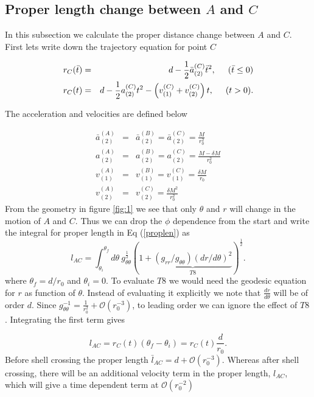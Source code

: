 \documentclass[aps,showpacs,onecolumn,floats,prd,superscriptaddress,nofootinbib]{revtex4-1}
\begin{document}
\subsection{Proper length change between $A$ and $C$}

In this subsection we calculate the proper distance change between $A$ and $C$. First lets write down the trajectory equation for point $C$

\begin{eqnarray}
	r_{C}(\bar{t})  & = & d - \frac{1}{2} \bar{a}_{(2)}^{(C)}  \bar{t}^2 ,  \hspace{5mm} (\bar{t} \leq 0 )		\nonumber	\\
	r_{C}(t) & = &  d - \frac{1}{2} a_{(2)}^{(C)} t^2 - \left(v^{(C)}_{(1)} + v^{(C)}_{(2)} \right) t,  \hspace{5mm} (t >0) . 
\end{eqnarray}

The acceleration and velocities are defined below

\begin{eqnarray}
	\bar{a}^{(A)}_{(2)} & = & \bar{a}^{(B)}_{(2)} = \bar{a}^{(C)}_{(2)} = \frac{M}{r_0^2}	\nonumber	\\
	a^{(A)}_{(2)} & = & a^{(B)}_{(2)} = a^{(C)}_{(2)} = \frac{M - \delta M}{r_0^2}	\nonumber	\\
	v^{(A)}_{(1)} & = & v^{(B)}_{(1)} = v^{(C)}_{(1)}  =  \frac{\delta M}{r_0} 	\nonumber	\\
	v^{(A)}_{(2)} & = & v^{(C)}_{(2)} =  \frac{\delta M^2}{r_0^2}		
\end{eqnarray}
From the geometry in figure \ref{fig:1} we see that only $\theta$ and $r$ will change in the motion of $A$ and $C$. Thus we can drop the $\phi$ dependence from the start and write the integral for proper length in Eq (\ref{proplen}) as
\begin{equation}
	 l_{AC} = \int^{\theta_f}_{\theta_i} d \theta \ g_{\theta \theta}^\frac{1}{2} \left(  1 + \underbrace{(g_{rr}/g_{\theta \theta}) (dr/d\theta)^2}_{T8}  \right)^\frac{1}{2}.
\end{equation}
where $\theta_f = d/r_0$ and $\theta_i = 0$. To evaluate $T8$ we would need the geodesic equation for $r$ as function of $\theta$. Instead of evaluating it explicitly we note that $\frac{dr}{d \theta}$ will be of order $d$. Since $g_{\theta \theta}^{-1} = \frac{1}{r_0^2} + \mathcal{O}(r_0^{-3})$, to leading order we can ignore the effect of $T8$. Integrating the first term gives

\begin{equation}
	l_{AC} = r_C(t) (\theta_f - \theta_i) = r_C(t) \frac{d}{r_0}.
\end{equation}
Before shell crossing the proper length $\bar{l}_{AC} = d + \mathcal{O}(r_0^{-3})$. Whereas after shell crossing, there will be an additional velocity term in the proper length, $l_{AC}$, which will give a time dependent term at $\mathcal{O}(r_0^{-2})$
\end{document}
